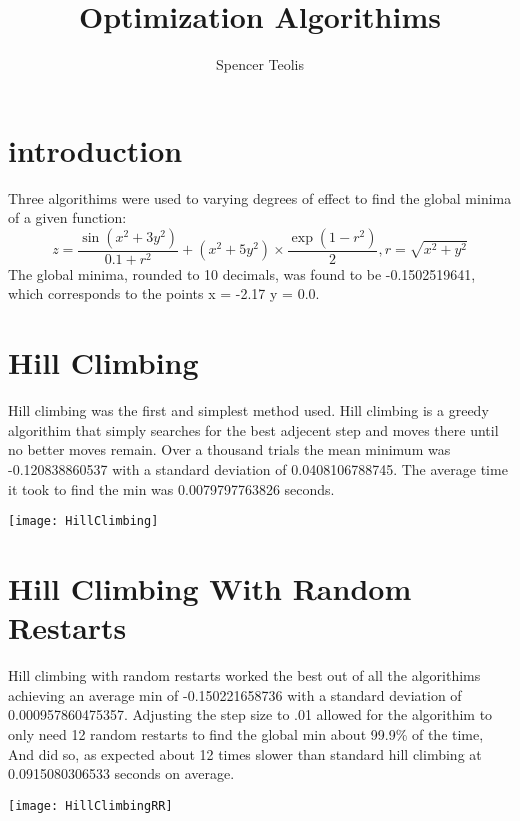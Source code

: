 \documentclass[12pt]{article}
\author{Spencer Teolis}
\title{Optimization Algorithims}
\date{}
\begin{document}
\begin{titlepage}
\maketitle
\end{titlepage}

\section{introduction}
Three algorithims were used to varying degrees of effect to find the global minima of a given function:
\begin{equation}
z = \dfrac{\sin(x^{2} + 3y^{2})}{0.1 + r^{2}} + (x^{2}+5y^{2}) \times \dfrac{\exp(1 - r^{2})}{2}, r = \sqrt{x^{2} + y^{2}}
\end{equation}
The global minima, rounded to 10 decimals, was found to be -0.1502519641, which corresponds to the points x = -2.17 y = 0.0.


\section{Hill Climbing}
Hill climbing was the first and simplest method used. Hill climbing is a greedy algorithim that simply searches for the best adjecent step and moves there until no better moves remain. Over a thousand trials the mean minimum was -0.120838860537 with a standard deviation of 0.0408106788745. The average time it took to find the min was 0.0079797763826 seconds. 


\texttt{[image: HillClimbing]}

\pagebreak

\section{Hill Climbing With Random Restarts}
Hill climbing with random restarts worked the best out of all the algorithims achieving an average min of -0.150221658736 with a standard deviation of 0.000957860475357. Adjusting the step size to .01 allowed for the algorithim to only need 12 random restarts to find the global min about 99.9\% of the time, And did so, as expected about 12 times slower than standard hill climbing at 0.0915080306533 seconds on average.

\texttt{[image: HillClimbingRR]}
\end{document}
